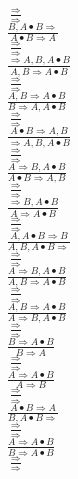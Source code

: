 \documentclass[11pt]{article}
\begin{document}
\begin{center}
\bigskip
\\$\frac{\Rightarrow }{\Rightarrow }$
\bigskip
\\$\frac{B, A\bullet B\Rightarrow }{A\bullet B\Rightarrow A}$
\bigskip
\\$\frac{\Rightarrow }{\Rightarrow }$
\bigskip
\\$\frac{\Rightarrow A, B, A\bullet B}{A, B\Rightarrow A\bullet B}$
\bigskip
\\$\frac{\Rightarrow }{\Rightarrow }$
\bigskip
\\$\frac{A, B\Rightarrow A\bullet B}{B\Rightarrow A, A\bullet B}$
\bigskip
\\$\frac{\Rightarrow }{\Rightarrow }$
\bigskip
\\$\frac{A\bullet B\Rightarrow A, B}{\Rightarrow A, B, A\bullet B}$
\bigskip
\\$\frac{\Rightarrow }{\Rightarrow }$
\bigskip
\\$\frac{A\Rightarrow B, A\bullet B}{A\bullet B\Rightarrow A, B}$
\bigskip
\\$\frac{\Rightarrow }{\Rightarrow }$
\bigskip
\\$\frac{\Rightarrow B, A\bullet B}{A\Rightarrow A\bullet B}$
\bigskip
\\$\frac{\Rightarrow }{\Rightarrow }$
\bigskip
\\$\frac{A, A\bullet B\Rightarrow B}{A, B, A\bullet B\Rightarrow }$
\bigskip
\\$\frac{\Rightarrow }{\Rightarrow }$
\bigskip
\\$\frac{A\Rightarrow B, A\bullet B}{A, B\Rightarrow A\bullet B}$
\bigskip
\\$\frac{\Rightarrow }{\Rightarrow }$
\bigskip
\\$\frac{A, B\Rightarrow A\bullet B}{A\Rightarrow B, A\bullet B}$
\bigskip
\\$\frac{\Rightarrow }{\Rightarrow }$
\bigskip
\\$\frac{B\Rightarrow A\bullet B}{B\Rightarrow A}$
\bigskip
\\$\frac{\Rightarrow }{\Rightarrow }$
\bigskip
\\$\frac{A\Rightarrow A\bullet B}{A\Rightarrow B}$
\bigskip
\\$\frac{\Rightarrow }{\Rightarrow }$
\bigskip
\\$\frac{A\bullet B\Rightarrow A}{B, A\bullet B\Rightarrow }$
\bigskip
\\$\frac{\Rightarrow }{\Rightarrow }$
\bigskip
\\$\frac{A\Rightarrow A\bullet B}{B\Rightarrow A\bullet B}$
\bigskip
\\$\frac{\Rightarrow }{\Rightarrow }$

\end{center}
\end{document}

